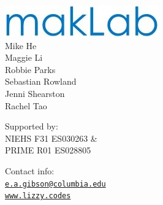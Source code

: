 \documentclass{beamer}
\begin{document}
{\begin{columns}
\begin{flushright}
\includegraphics[scale=0.35]{figures/makLab_logo.jpg} \\ 
\vspace{2mm}
\scriptsize Mike He \\
Maggie Li \\
Robbie Parks \\
Sebastian Rowland \\
Jenni Shearston \\
Rachel Tao \\

\vspace{5mm}

{\color{hgray}Supported by: \\
NIEHS F31 ES030263 \& \\
PRIME R01 ES028805 \\
}

\vspace{5mm}

\scriptsize Contact info: \\
\vspace{0.5ex}
\hspace{-2ex}
\href{mailto:e.a.gibson@columbia.edu}{\faEnvelopeO \hspace{0.25ex} \tt e.a.gibson@columbia.edu} \\
\href{http://www.lizzy.codes}{\faGlobe \hspace{0.5ex} \tt www.lizzy.codes}
\end{flushright}
\end{columns}
}
\end{document}

